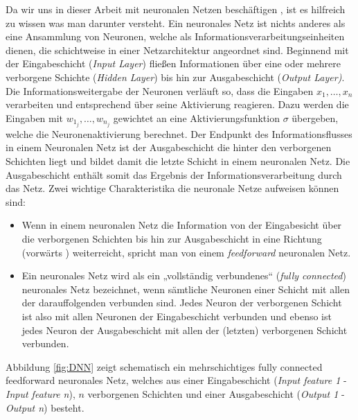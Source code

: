 Da wir uns in dieser Arbeit mit neuronalen Netzen beschäftigen , ist es hilfreich zu wissen was man darunter versteht. Ein neuronales Netz ist nichts anderes als eine Ansammlung von Neuronen, welche als Informationsverarbeitungseinheiten dienen, die schichtweise in einer Netzarchitektur angeordnet sind. Beginnend mit der Eingabeschicht (\textit{Input Layer}) fließen Informationen über eine oder mehrere verborgene Schichte (\textit{Hidden Layer}) bis hin zur Ausgabeschicht (\textit{Output Layer)}. Die Informationsweitergabe der Neuronen verläuft so, dass die Eingaben $x_1,\dots,x_n$ verarbeiten und entsprechend über seine Aktivierung reagieren. Dazu werden die Eingaben mit $w_{1_j}, \dots, w_{n_j}$ gewichtet an eine Aktivierungsfunktion $\sigma$ übergeben, welche die Neuronenaktivierung berechnet. Der Endpunkt des Informationsflusses in einem Neuronalen Netz ist der Ausgabeschicht die hinter den verborgenen Schichten liegt und bildet damit die letzte Schicht in einem neuronalen Netz. Die Ausgabeschicht enthält somit das Ergebnis der Informationsverarbeitung durch das Netz.  
Zwei wichtige Charakteristika die neuronale Netze aufweisen können sind:
\begin{itemize}
\item Wenn in einem neuronalen Netz die Information von der Eingabesicht über die verborgenen Schichten bis hin zur Ausgabeschicht in eine Richtung (\glqq vorwärts \grqq) weiterreicht, spricht man von einem \textit{feedforward} neuronalen Netz.
\item Ein neuronales Netz wird als ein „vollständig verbundenes“ (\textit{fully connected}) neuronales Netz bezeichnet, wenn sämtliche Neuronen einer Schicht mit allen der darauffolgenden verbunden sind. Jedes Neuron der verborgenen Schicht ist also mit allen Neuronen der Eingabeschicht verbunden und ebenso ist jedes Neuron der Ausgabeschicht mit allen der (letzten) verborgenen Schicht verbunden.
\end{itemize}
Abbildung \ref{fig:DNN} zeigt schematisch ein mehrschichtiges fully connected feedforward neuronales Netz, welches aus einer Eingabeschicht (\textit{Input feature 1} - \textit{Input feature n}), $n$ verborgenen Schichten und einer Ausgabeschicht (\textit{Output 1} - \textit{Output n}) besteht.
